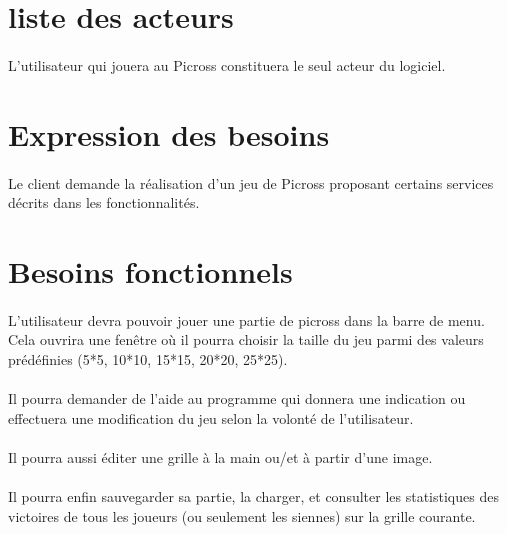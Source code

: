 \section{liste des acteurs}
\paragraph*{}
L'utilisateur qui jouera au Picross constituera le seul acteur du logiciel.


\section{Expression des besoins}
\paragraph*{}
Le client demande la réalisation d'un jeu de Picross proposant certains services décrits dans les fonctionnalités. 



\section{Besoins fonctionnels}
\paragraph*{}
L'utilisateur devra pouvoir jouer une partie de picross dans la barre de menu. Cela ouvrira une fenêtre où il pourra choisir la taille du jeu  parmi des valeurs prédéfinies (5*5, 10*10, 15*15, 20*20, 25*25). 
\paragraph*{}
Il pourra demander de l'aide au programme qui donnera une indication ou effectuera une modification du jeu selon la volonté de l'utilisateur.
\paragraph*{}
Il pourra aussi éditer une grille à la main ou/et à partir d'une image.
\paragraph*{}
Il pourra enfin sauvegarder sa partie, la charger, et consulter les statistiques des victoires de tous les joueurs (ou seulement les siennes) sur la grille courante.


